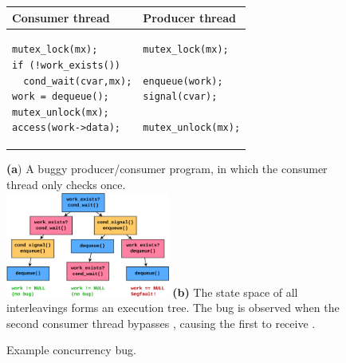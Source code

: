 
\begin{figure}[t]
	\begin{tabular}{l|l}
	Consumer thread & Producer thread \\
	\hline
\begin{lstlisting}
mutex_lock(mx);
if (!work_exists())
  cond_wait(cvar,mx);
work = dequeue();
mutex_unlock(mx);
access(work->data);
\end{lstlisting}
	&
\begin{lstlisting}
mutex_lock(mx);

enqueue(work);
signal(cvar);

mutex_unlock(mx);
\end{lstlisting}
	\end{tabular}
	{\bf (a}) A buggy producer/consumer program, in which the consumer thread only checks  once.
	\vspace{1em}
	\\
	\includegraphics[width=0.48\textwidth]{execution-tree.pdf}
	{\bf (b)} The state space of all interleavings forms an execution tree. %
	The bug is observed when the second consumer thread bypasses , causing the first to receive .
	\caption{Example concurrency bug.}
	\label{fig:paradise}
\end{figure}

